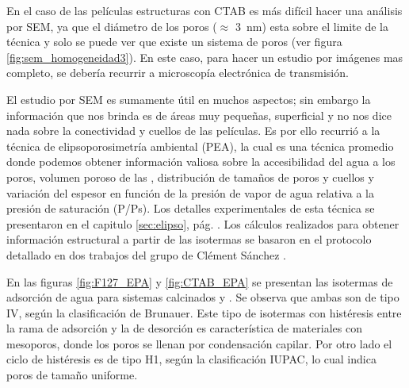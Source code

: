 		En el caso de las películas estructuras con CTAB es más difícil hacer una análisis por SEM, ya que el diámetro de los poros ($\approx$ \SI{3}{\nm}) esta sobre el limite de la técnica y solo se puede ver que existe un sistema de poros (ver figura \ref{fig:sem_homogeneidad3}). En este caso, para hacer un estudio por imágenes mas completo, se debería recurrir a microscopía electrónica de transmisión.

		El estudio por SEM es sumamente útil en muchos aspectos; sin embargo la información que nos brinda es de áreas muy pequeñas, superficial y no nos dice nada sobre la conectividad y cuellos de las películas.  Es por ello recurrió a la técnica de elipsoporosimetría ambiental (PEA), la cual es una técnica promedio donde podemos obtener información valiosa sobre la accesibilidad del agua a los poros, volumen poroso de las \pdm, distribución de tamaños de poros y cuellos y variación del espesor en función de la presión de vapor de agua relativa a la presión de saturación (P/Ps). Los detalles experimentales de esta técnica se presentaron en el capitulo \ref{sec:elipso}, pág. \pageref{sec:elipso}. Los cálculos realizados para obtener información estructural a partir de las isotermas se basaron en el protocolo detallado en dos trabajos del grupo de Clément Sánchez \cite{Boissiere2005,Sakatani2006}.

		En las figuras \ref{fig:F127_EPA} y \ref{fig:CTAB_EPA} se presentan las isotermas de adsorción de agua para sistemas calcinados \pdmF\space y \pdmC. Se observa que ambas son de tipo IV, según la clasificación de Brunauer\cite{Gregg1967,Violi2015,Fuertes2010}. Este tipo de isotermas con histéresis entre la rama de adsorción y la de desorción es característica de materiales con mesoporos, donde los poros se llenan por condensación capilar. Por otro lado el ciclo de histéresis es de tipo H1, según la clasificación IUPAC\cite{Gregg1967,Lowell2004,Sing1985a}, lo cual indica poros de tamaño uniforme.

